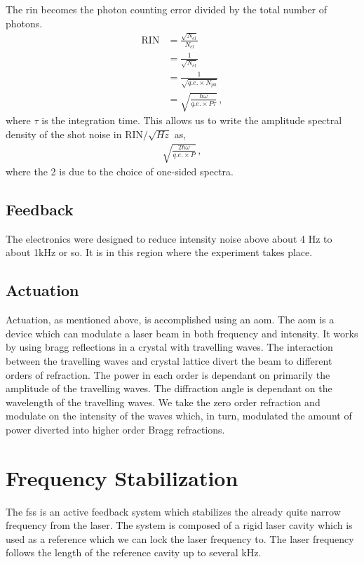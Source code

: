 The \ac{rin} becomes the photon counting error divided by the total number
of photons.
\begin{align}
\mathrm{RIN} &= \frac{\sqrt{N_{el}}}{N_{el}} \\
     &= \frac{1}{\sqrt{N_{el}}} \\
     &= \frac{1}{\sqrt{q.e. \times N_{ph}}} \\
     &= \sqrt{\frac{\hbar \omega}{q.e. \times P \tau}} \, ,
\end{align}
where $\tau$ is the integration time. This allows us to write the amplitude
spectral density of the shot noise in $\mathrm{RIN} / \sqrt{H\!z}$ as,
\begin{align}
\sqrt{\frac{2 \hbar \omega}{q.e. \times P}} \, ,
\end{align}
where the 2 is due to the choice of one-sided spectra.

\subsection{Feedback}

The electronics were designed to reduce intensity noise above about 4 Hz to
about 1kHz or so. It is in this region where the experiment takes place.

\subsection{Actuation}

Actuation, as mentioned above, is accomplished using an \ac{aom}. The
\ac{aom} is a device which can modulate a laser beam in both frequency
and intensity. It works by using bragg reflections in a crystal with
travelling waves. The interaction between the travelling waves and crystal
lattice divert the beam to different orders of refraction. The power in each
order is dependant on primarily the amplitude of the travelling waves. The
diffraction angle is dependant on the wavelength of the travelling waves.
We take the zero order refraction and modulate on the intensity of the
waves which, in turn, modulated the amount of power diverted into higher order
Bragg refractions.

\section{Frequency Stabilization}
\label{sec:fss}

The \ac{fss} is an active feedback system which stabilizes the already quite
narrow frequency from the laser. The system is composed of a rigid laser cavity
which is used as a reference which we can lock the laser frequency to. The
laser frequency follows the length of the reference cavity up to several kHz.

